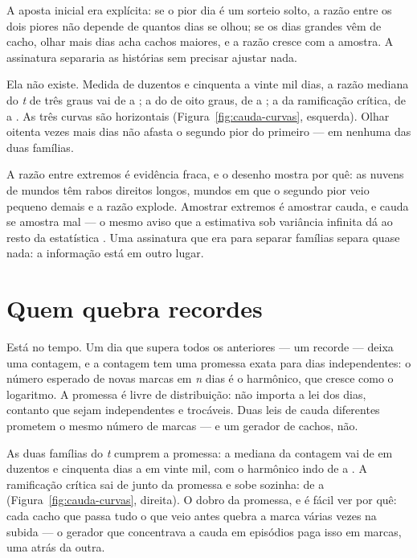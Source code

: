 A aposta inicial era explícita: se o pior dia é um sorteio solto, a razão entre os dois piores não
depende de quantos dias se olhou; se os dias grandes vêm de cacho, olhar mais dias acha cachos
maiores, e a razão cresce com a amostra. A assinatura separaria as histórias sem precisar ajustar
nada.

Ela não existe. Medida de duzentos e cinquenta a vinte mil dias, a razão mediana do \emph{t} de
três graus vai de \numCaudaIndependenteRazaoInicio{} a \numCaudaIndependenteRazaoFim{}; a do de
oito graus, de \numCaudaIndependenteOitoRazaoInicio{} a \numCaudaIndependenteOitoRazaoFim{}; a da
ramificação crítica, de \numCaudaReproducaoRazaoInicio{} a \numCaudaReproducaoRazaoFim{}. As três
curvas são horizontais (Figura~\ref{fig:cauda-curvas}, esquerda). Olhar oitenta vezes mais dias
não afasta o segundo pior do primeiro --- em nenhuma das duas famílias.

A razão entre extremos é evidência fraca, e o desenho mostra por quê: as nuvens de mundos têm
rabos direitos longos, mundos em que o segundo pior veio pequeno demais e a razão explode. Amostrar
extremos é amostrar cauda, e cauda se amostra mal --- o mesmo aviso que a estimativa sob variância
infinita dá ao resto da estatística \cite{fontanari2020gini}. Uma assinatura que era para separar
famílias separa quase nada: a informação está em outro lugar.

\section{Quem quebra recordes}

Está no tempo. Um dia que supera todos os anteriores --- um recorde --- deixa uma contagem, e a
contagem tem uma promessa exata para dias independentes: o número esperado de novas marcas em
\emph{n} dias é o harmônico, que cresce como o logaritmo. A promessa é livre de distribuição: não
importa a lei dos dias, contanto que sejam independentes e trocáveis. Duas leis de cauda
diferentes prometem o mesmo número de marcas --- e um gerador de cachos, não.

As duas famílias do \emph{t} cumprem a promessa: a mediana da contagem vai de
\numCaudaIndependenteRecordesInicio{} em duzentos e cinquenta dias a \numCaudaIndependenteRecordesFim{}
em vinte mil, com o harmônico indo de \numCaudaRecordesEsperadoInicio{} a
\numCaudaIndependenteRecordesEsperadoFim{}. A ramificação crítica sai de junto da promessa e sobe
sozinha: de \numCaudaReproducaoRecordesInicio{} a \numCaudaReproducaoRecordesFim{}
(Figura~\ref{fig:cauda-curvas}, direita). O dobro da promessa, e é fácil ver por quê: cada cacho
que passa tudo o que veio antes quebra a marca várias vezes na subida --- o gerador que concentrava
a cauda em episódios paga isso em marcas, uma atrás da outra.

